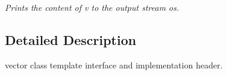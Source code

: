 \begin{DoxyCompactItemize}
\begin{DoxyCompactList}\small\item\em Prints the content of v to the output stream os. \end{DoxyCompactList}\end{DoxyCompactItemize}


\subsection{Detailed Description}
vector class template interface and implementation header. 
